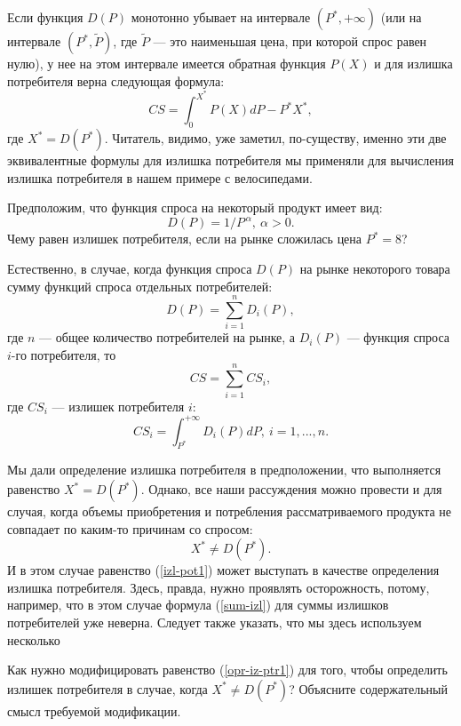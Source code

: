     Если функция $D(P)$ монотонно убывает на интервале $(P^{*},+\infty)$
    (или на интервале $(P^{*},\tilde{P})$, где $\tilde{P}$ --- это наименьшая
    цена, при которой спрос равен нулю), у нее на этом интервале имеется
    обратная функция $P(X)$ и для излишка потребителя верна следующая
    формула:
\begin{equation}
  \label{izl-pot1}
    CS=\int_{0}^{X^{*}}P(X)dP-P^{*}X^{*},
\end{equation}
    где $X^{*}=D(P^{*})$. Читатель, видимо, уже заметил, по-существу, именно эти две
    эквивалентные формулы для излишка потребителя мы применяли для
    вычисления излишка потребителя в нашем примере с велосипедами.

\begin{exer}
      Предположим, что функция спроса на некоторый продукт имеет вид:
     \[D(P)=1/P^{\,\alpha}, \ \alpha>0. \]
      Чему равен излишек потребителя, если на рынке сложилась цена $P^{*}=8$?
\end{exer}





      Естественно, в случае, когда функция спроса $D(P)$ на рынке
    некоторого товара сумму функций спроса отдельных потребителей:
    \[D(P)=\sum_{i=1}^{n}D_{i}(P),\]
    где $n$ --- общее количество потребителей на рынке, а $D_{i}(P)$
    --- функция спроса $i$-го потребителя, то
\begin{equation}
\label{sum-izl}
    CS=\sum_{i=1}^{n}CS_{i},
\end{equation}
    где $CS_{i}$ --- излишек потребителя $i$:
    \[CS_{i}=\int_{P^{*}}^{+\infty}D_{i}(P)dP, \ i=1,...,n.\]


    Мы дали определение излишка потребителя в предположении, что
    выполняется равенство $X^{*}=D(P^{*})$. Однако, все наши
    рассуждения можно провести и для случая, когда объемы приобретения
    и потребления рассматриваемого продукта не совпадает по каким-то
    причинам со спросом:
    \[X^{*}\neq D(P^{*}).\]
    И в этом случае равенство (\ref{izl-pot1}) может выступать в
    качестве определения излишка потребителя. Здесь, правда, нужно
    проявлять осторожность, потому, например, что в этом случае формула
    (\ref{sum-izl}) для суммы излишков потребителей уже неверна.
    Следует также указать, что мы здесь используем несколько

\begin{exer}
    Как нужно модифицировать равенство (\ref{opr-iz-ptr1}) для того,
    чтобы определить излишек потребителя в случае, когда
    $X^{*}\neq D(P^{*})$? Объясните содержательный смысл требуемой
    модификации.
\end{exer}







